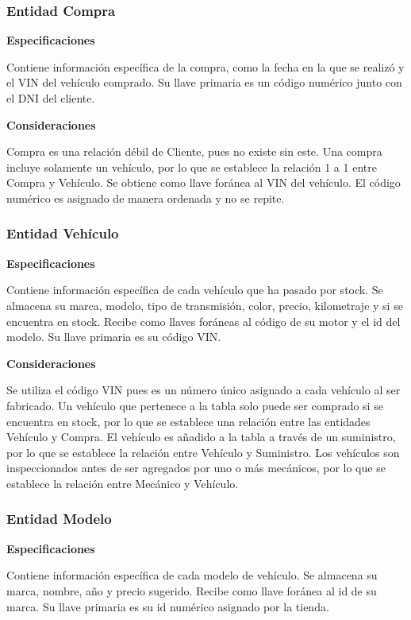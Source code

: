 \documentclass[12pt]{article}
\begin{document}
\subsubsection{Entidad Compra}
\textbf{Especificaciones}

Contiene información específica de la compra, como la fecha en la que se realizó y el VIN del vehículo comprado. Su llave primaria es un código numérico junto con el DNI del cliente.

\textbf{Consideraciones}

Compra es una relación débil de Cliente, pues no existe sin este. Una compra incluye solamente un vehículo, por lo que se establece la relación 1 a 1 entre Compra y Vehículo. Se obtiene como llave foránea al VIN del vehículo. El código numérico es asignado de manera ordenada y no se repite.

\subsubsection{Entidad Vehículo}
\textbf{Especificaciones}

Contiene información específica de cada vehículo que ha pasado por stock. Se almacena su marca, modelo, tipo de transmisión, color, precio, kilometraje y si se encuentra en stock. Recibe como llaves foráneas al código de su motor y el id del modelo. Su llave primaria es su código VIN.

\textbf{Consideraciones}

Se utiliza el código VIN pues es un número único asignado a cada vehículo al ser fabricado. Un vehículo que pertenece a la tabla solo puede ser comprado si se encuentra en stock, por lo que se establece una relación entre las entidades Vehículo y Compra. El vehículo es añadido a la tabla a través de un suministro, por lo que se establece la relación entre Vehículo y Suministro. Los vehículos son inspeccionados antes de ser agregados por uno o más mecánicos, por lo que se establece la relación entre Mecánico y Vehículo.


\subsubsection{Entidad Modelo}
\textbf{Especificaciones}

Contiene información específica de cada modelo de vehículo. Se almacena su marca, nombre, año y precio sugerido. Recibe como llave foránea al id de su marca. Su llave primaria es su id numérico asignado por la tienda.
\end{document}
